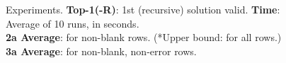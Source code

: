 \begin{figure}
\vsepBeforeCaption
  \captionsetup{justification=centering}
  \caption{
    Experiments.
      \textbf{Top-1(-R)}:
      1st (recursive) solution valid.
    \textbf{Time}:
       Average of 10 runs, in seconds.
    \\
    \textbf{2a Average}:
      \pctFewerExamplesTopOne{} for \numBenchmarks{} non-blank rows.
      (*Upper bound: \pctFewerExamplesTopOneUpperBound{} for all
     \numBenchmarksAll{} rows.)
    \\
    \textbf{3a Average}:
      \pctFewerExamplesBaseCaseStrategy{} for
      \numBenchmarksBase{} non-blank, non-error rows.
  }
\label{fig:experiments}
\end{figure}
